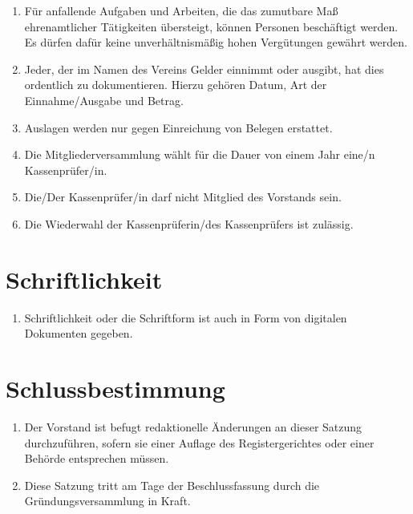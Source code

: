\documentclass[12pt,a4paper,draft]{article}
\begin{document}
\begin{enumerate}
\item Für anfallende Aufgaben und Arbeiten, die das zumutbare Maß 
ehrenamtlicher Tätigkeiten übersteigt, können Personen beschäftigt werden. Es 
dürfen dafür keine unverhältnismäßig hohen Vergütungen gewährt werden.

\item Jeder, der im Namen des Vereins Gelder einnimmt oder ausgibt, hat dies 
ordentlich zu dokumentieren. Hierzu gehören Datum, Art der Einnahme/Ausgabe und 
Betrag.

\item Auslagen werden nur gegen Einreichung von Belegen erstattet.

\item Die Mitgliederversammlung wählt für die Dauer von einem Jahr eine/n 
Kassenprüfer/in.

\item Die/Der Kassenprüfer/in darf nicht Mitglied des Vorstands sein.

\item Die Wiederwahl der Kassenprüferin/des Kassenprüfers ist zulässig.
\end{enumerate}

\section{Schriftlichkeit}
\begin{enumerate}
\item Schriftlichkeit oder die Schriftform ist auch in Form von digitalen Dokumenten gegeben.
\end{enumerate}

\section{Schlussbestimmung}
\begin{enumerate}
\item Der Vorstand ist befugt redaktionelle Änderungen an dieser Satzung 
durchzuführen, sofern sie einer Auflage des Registergerichtes oder einer 
Behörde entsprechen müssen.

\item Diese Satzung tritt am Tage der Beschlussfassung durch die Gründungsversammlung in Kraft.
\end{enumerate}

\end{document}
